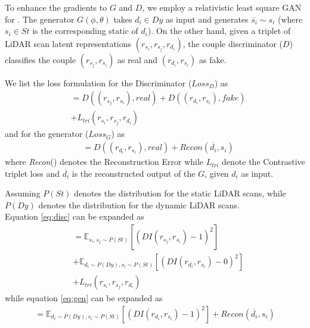 To enhance the gradients to $G$ and  $D$, we employ a relativistic least square GAN for \dslr{}.
    The generator $G(\phi,\theta{})$ takes $d_i\in Dy$ as input and generates $\overline{s_i} \sim s_i$ (where ${s_i} \in St$  is the corresponding static of $d_i$). On the other hand, given a triplet of LiDAR scan latent representations $(r_{s_i}, r_{s_j}, r_{d_i})$, the couple discriminator ($D$) classifies the couple $(r_{s_j}, r_{s_i})$ as real and $(r_{d_i}, r_{s_i})$ as fake. 

     We list the loss formulation for the Discriminator ($Loss_{D}$) as 
    \begin{equation}
    \begin{split}
           &= D((r_{s_j},r_{s_i}), real) + D((r_{d_i},r_{s_i}), fake)\\ &+ {L_{tri}}(r_{s_i}, r_{s_j}, r_{d_i})
    \end{split}
    \label{eq:disc}
    \end{equation}
    and for the generator ($Loss_{G}$) as 
    \begin{equation} 
    \begin{split}   
    &= D((r_{d_i},r_{s_i}), real) +Recon(\overline{d_i},s_i)
    \end{split}
    \label{eq:gen}
    \end{equation}
    where \textit{Recon}() denotes the Reconstruction Error while $L_{tri}$ denote the Contrastive triplet loss and $\overline{d_i}$ is the reconstructed output of the $G$, given $d_i$ as input.

    

    Assuming $P(St)$ denotes the distribution for the static LiDAR scans, while $P(Dy)$ denotes the distribution for the dynamic LiDAR scans. \\

    
    Equation \ref{eq:disc} can be expanded as
    \begin{equation}
    \begin{split}
     & =
    {\mathbb{E}}_{s_i,s_j\sim P(St)}[(DI(r_{s_j},r_{s_i}) -1)^{2}]\\
    & + {\mathbb{E}}_{d_i\sim P(Dy),s_i\sim P(St)}[(DI(r_{d_i},r_{s_i}) - 0)^{2}] \\ 
    & + {L_{tri}}(r_{s_i}, r_{s_j}, r_{d_i})
    \end{split}
    \end{equation}
    while equation \ref{eq:gen} can be expanded as
    \begin{equation}
    \begin{split}
         =
         {\mathbb{E}}_{d_i\sim P(Dy),s_i\sim P(St)}[(DI(r_{d_i},r_{s_i}) -1)^{2}] +
    Recon(\overline{d_i}, s_i)
    \end{split}
    \label{egenloss}
    \end{equation}







